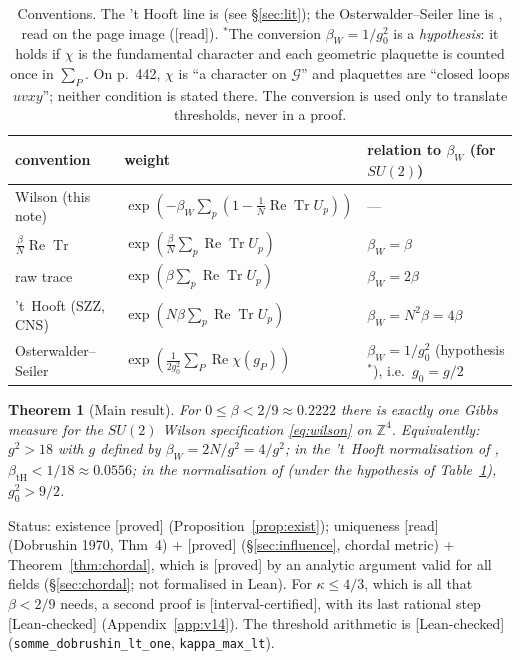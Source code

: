 \documentclass[11pt,a4paper]{article}
\newtheorem{theorem}{Theorem}
\theoremstyle{remark}
\theoremstyle{definition}
\theoremstyle{plain}
\theoremstyle{remark}
\newcommand{\Z}{\mathbb{Z}}
\newcommand{\ReTr}{\operatorname{Re}\operatorname{Tr}}
\newcommand{\st}[1]{\textsf{[#1]}}
\begin{document}
\begin{table}[htbp]
\centering\small
\begin{tabular}{lll}
\toprule
convention & weight & relation to $\beta_W$ (for $SU(2)$)\\
\midrule
Wilson (this note) & $\exp(-\beta_W\sum_p(1-\frac1N\ReTr U_p))$ & ---\\
$\frac{\beta}{N}\ReTr$ & $\exp(\frac{\beta}{N}\sum_p \ReTr U_p)$ & $\beta_W=\beta$\\
raw trace & $\exp(\beta\sum_p\ReTr U_p)$ & $\beta_W=2\beta$\\
't~Hooft (SZZ, CNS) & $\exp(N\beta\sum_p\ReTr U_p)$ & $\beta_W=N^2\beta=4\beta$\\
Osterwalder--Seiler & $\exp(\frac{1}{2g_0^2}\sum_P \operatorname{Re}\chi(g_P))$ & $\beta_W=1/g_0^2$ (hypothesis${}^\ast$), i.e.\ $g_0=g/2$\\
\bottomrule
\end{tabular}
\caption{Conventions. The 't Hooft line is \cite[(1.2)]{SZZ23} (see \S\ref{sec:lit}); the
Osterwalder--Seiler line is \cite[(2.1)--(2.2), p.~442]{OS78}, read on the page image
(\st{read}). ${}^\ast$The conversion $\beta_W=1/g_0^2$ is a \emph{hypothesis}: it holds if $\chi$ is the
fundamental character and each geometric plaquette is counted once in $\sum_P$. On p.~442, $\chi$ is
``a character on $\mathcal G$'' and plaquettes are ``closed loops $uvxy$''; neither condition is stated
there. The conversion is used only to translate thresholds, never in a proof.}
\label{tab:conv}
\end{table}

\begin{theorem}[Main result]\label{thm:main}
For $0\le\beta<2/9\approx0.2222$ there is exactly one Gibbs measure for the $SU(2)$ Wilson
specification \eqref{eq:wilson} on $\Z^4$.
Equivalently: $g^2>18$ with $g$ defined by $\beta_W=2N/g^2=4/g^2$; in the 't~Hooft normalisation of
\cite{SZZ23}, $\beta_{\mathrm{tH}}<1/18\approx0.0556$; in the normalisation of \cite{OS78} (under the hypothesis
of Table~\ref{tab:conv}), $g_0^2>9/2$.
\end{theorem}
\noindent Status: existence \st{proved} (Proposition~\ref{prop:exist});
uniqueness \st{read} (Dobrushin 1970, Thm~4) + \st{proved} (\S\ref{sec:influence}, chordal metric) +
Theorem~\ref{thm:chordal}, which is \st{proved} by an analytic argument valid for all fields (\S\ref{sec:chordal}; not formalised in Lean).
For $\kappa\le4/3$, which is all that $\beta<2/9$ needs, a second proof is \st{interval-certified}, with its last rational
step \st{Lean-checked} (Appendix~\ref{app:v14}). The threshold arithmetic is \st{Lean-checked}
(\texttt{somme\_dobrushin\_lt\_one}, \texttt{kappa\_max\_lt}).
\end{document}
